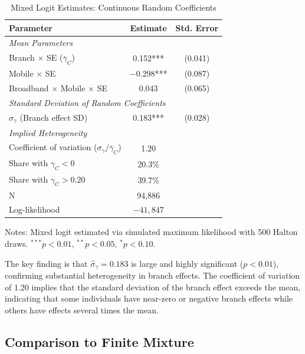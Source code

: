 \documentclass[12pt]{article}
\begin{document}
\begin{table}[H]
\centering
\caption{Mixed Logit Estimates: Continuous Random Coefficients}
\label{tab:mixed_logit_results}
\begin{threeparttable}
\begin{tabular}{lcc}
\toprule
Parameter & Estimate & Std. Error \\
\midrule
\multicolumn{3}{l}{\textit{Mean Parameters}} \\
Branch $\times$ SE ($\bar{\gamma}_C$) & 0.152*** & (0.041) \\
Mobile $\times$ SE & $-0.298$*** & (0.087) \\
Broadband $\times$ Mobile $\times$ SE & 0.043 & (0.065) \\
\midrule
\multicolumn{3}{l}{\textit{Standard Deviation of Random Coefficients}} \\
$\sigma_\gamma$ (Branch effect SD) & 0.183*** & (0.028) \\
\midrule
\multicolumn{3}{l}{\textit{Implied Heterogeneity}} \\
Coefficient of variation ($\sigma_\gamma / \bar{\gamma}_C$) & 1.20 & \\
Share with $\gamma_C < 0$ & 20.3\% & \\
Share with $\gamma_C > 0.20$ & 39.7\% & \\
\midrule
N & 94,886 & \\
Log-likelihood & $-41,847$ & \\
\bottomrule
\end{tabular}
\begin{tablenotes}
\small
\item Notes: Mixed logit estimated via simulated maximum likelihood with 500 Halton draws. $^{***}p<0.01$, $^{**}p<0.05$, $^{*}p<0.10$.
\end{tablenotes}
\end{threeparttable}
\end{table}

The key finding is that $\hat{\sigma}_\gamma = 0.183$ is large and highly significant ($p < 0.01$), confirming substantial heterogeneity in branch effects. The coefficient of variation of 1.20 implies that the standard deviation of the branch effect exceeds the mean, indicating that some individuals have near-zero or negative branch effects while others have effects several times the mean.

\subsection{Comparison to Finite Mixture}
\end{document}
